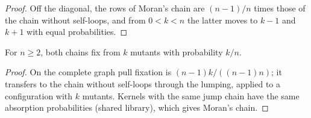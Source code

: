 \begin{proof}\leanok
Off the diagonal, the rows of Moran's chain are $(n-1)/n$ times those of the chain without
self-loops, and from $0<k<n$ the latter moves to $k-1$ and $k+1$ with equal probabilities.
\end{proof}
\begin{theorem}\label{thm:moran-counts-fixation}
\leanok{}
For $n\ge2$, both chains fix from $k$ mutants with probability $k/n$.
\end{theorem}
\begin{proof}\leanok
On the complete graph pull fixation is $(n-1)k/((n-1)n)$; it transfers to the chain without
self-loops through the lumping, applied to a configuration with $k$ mutants. Kernels with the same
jump chain have the same absorption probabilities (shared library), which gives Moran's chain.
\end{proof}

